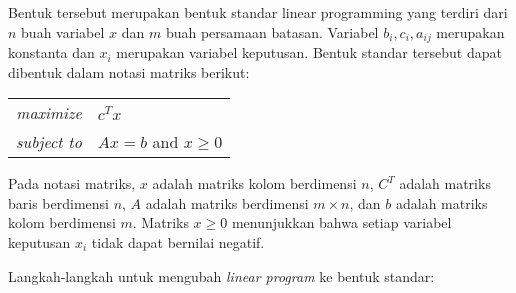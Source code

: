 Bentuk tersebut merupakan bentuk standar linear programming yang terdiri dari $n$ buah variabel $x$ dan $m$ buah persamaan batasan. Variabel $b_i,c_i,a_{ij}$ merupakan konstanta dan $x_i$ merupakan variabel keputusan. Bentuk standar tersebut dapat dibentuk dalam notasi matriks berikut:
        
\begin{center}
	\begin{tabular}{r l}
    	\textit{maximize}   & $c^Tx$ \\
        \textit{subject to} & $Ax=b$ and $x\geq0$
	\end{tabular}    
\end{center}
        
Pada notasi matriks, $x$ adalah matriks kolom berdimensi $n$, $C^T$ adalah matriks baris berdimensi $n$, $A$ adalah matriks berdimensi $m\times n$, dan $b$ adalah matriks kolom berdimensi $m$. Matriks $x\geq0$ menunjukkan bahwa setiap variabel keputusan $x_i$ tidak dapat bernilai negatif.
        
Langkah-langkah untuk mengubah \textit{linear program} ke bentuk standar:

